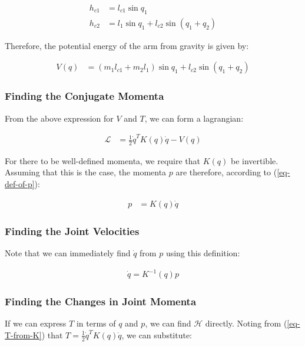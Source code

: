 \documentclass{article}
\begin{document}
\begin{align}
	h_{c1} & = l_{c1} \sin q_1 \label{eq-height-1}\\
	h_{c2} & = l_1 \sin q_1 + l_{c2} \sin (q_1 + q_2) \label{eq-height-2}
\end{align}

Therefore, the potential energy of the arm from gravity is given by:

\begin{align}
	V(q) & = 
		(m_1 l_{c1} + m_2 l_1) \sin q_1 + l_{c2} \sin (q_1 + q_2) \label{eq-V}
\end{align}

\subsubsection{Finding the Conjugate Momenta}

From the above expression for $V$ and $T$, we can form a lagrangian:

\begin{align}
	\mathcal{L} & = \frac 12 \dot{q}^T K(q) \dot{q} - V(q) \label{eq-our-L}
\end{align}

For there to be well-defined momenta, we require that $K(q)$ be invertible.
Assuming that this is the case, the momenta $p$ are therefore, 
	according to (\ref{eq-def-of-p}):

\begin{align}
	p & = K(q) \dot{q} \nonumber
\end{align}

\subsubsection{Finding the Joint Velocities}

Note that we can immediately find $\dot{q}$ from $p$ using this definition:

\begin{align}
	\dot{q} = K^{-1}(q) p \label{eq-q-dot-from-p}
\end{align}

\subsubsection{Finding the Changes in Joint Momenta}

If we can express $T$ in terms of $q$ and $p$, we can find $\mathcal{H}$ directly.
Noting from (\ref{eq-T-from-K}) that $T = \frac 12 \dot{q}^T K(q) \dot{q}$, we can substitute:
\end{document}

